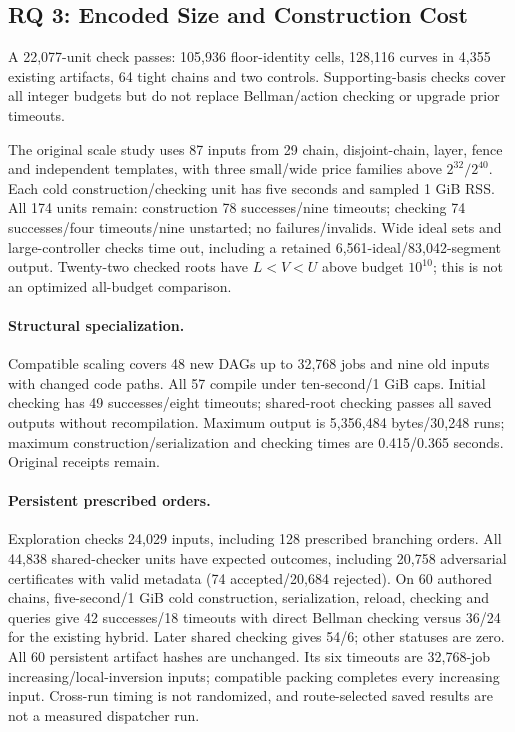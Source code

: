 \documentclass[acmsmall,screen,review,anonymous]{acmart}
\begin{document}
\subsection{RQ 3: Encoded Size and Construction Cost}

A 22,077-unit check passes: 105,936 floor-identity cells, 128,116 curves in 4,355 existing artifacts, 64 tight chains and two controls. Supporting-basis checks cover all integer budgets but do not replace Bellman/action checking or upgrade prior timeouts.

The original scale study uses 87 inputs from 29 chain, disjoint-chain, layer, fence and independent templates, with three small/wide price families above $2^{32}/2^{40}$. Each cold construction/checking unit has five seconds and sampled 1 GiB RSS. All 174 units remain: construction 78 successes/nine timeouts; checking 74 successes/four timeouts/nine unstarted; no failures/invalids. Wide ideal sets and large-controller checks time out, including a retained 6,561-ideal/83,042-segment output. Twenty-two checked roots have $L<V<U$ above budget $10^{10}$; this is not an optimized all-budget comparison.

\paragraph{Structural specialization.}
Compatible scaling covers 48 new DAGs up to 32,768 jobs and nine old inputs with changed code paths. All 57 compile under ten-second/1 GiB caps. Initial checking has 49 successes/eight timeouts; shared-root checking passes all saved outputs without recompilation. Maximum output is 5,356,484 bytes/30,248 runs; maximum construction/serialization and checking times are 0.415/0.365 seconds. Original receipts remain.

\paragraph{Persistent prescribed orders.}
Exploration checks 24,029 inputs, including 128 prescribed branching orders. All 44,838 shared-checker units have expected outcomes, including 20,758 adversarial certificates with valid metadata (74 accepted/20,684 rejected). On 60 authored chains, five-second/1 GiB cold construction, serialization, reload, checking and queries give 42 successes/18 timeouts with direct Bellman checking versus 36/24 for the existing hybrid. Later shared checking gives 54/6; other statuses are zero. All 60 persistent artifact hashes are unchanged. Its six timeouts are 32,768-job increasing/local-inversion inputs; compatible packing completes every increasing input. Cross-run timing is not randomized, and route-selected saved results are not a measured dispatcher run.
\end{document}

